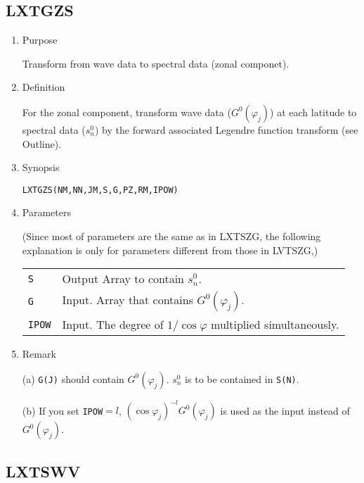 \documentclass[a4paper]{scrartcl}
\begin{document}

\subsection{LXTGZS}

\begin{enumerate}

\item Purpose 

Transform from wave data to spectral data (zonal componet).

\item Definition

For the zonal component, transform wave data ($G^0(\varphi_j)$) 
at each latitude
to spectral data ($s^0_n$) 
by the forward associated Legendre function transform (see Outline).

\item Synopsis 

\texttt{LXTGZS(NM,NN,JM,S,G,PZ,RM,IPOW)}
  
\item Parameters

(Since most of parameters are the same as in LXTSZG,
the following explanation is only for parameters
different from those in LVTSZG,)

\begin{tabular}{ll}
\texttt{S} & Output Array to contain $s^0_n$.\\
\texttt{G} & Input. Array that contains $G^0(\varphi_j)$.\\
\texttt{IPOW} & Input. 
The degree of $1/\cos\varphi$ multiplied 
simultaneously.
\end{tabular}

\item Remark

(a) \texttt{G(J)} should 
contain $G^0(\varphi_j)$.
$s^0_n$ is to 
be contained in \texttt{S(N)}.

(b) If you set \texttt{IPOW}$=l$, 
$(\cos\varphi_j)^{-l}G^0(\varphi_j)$ is used as the input
instead of $G^0(\varphi_j)$.

\end{enumerate}


\subsection{LXTSWV}
\end{document}
